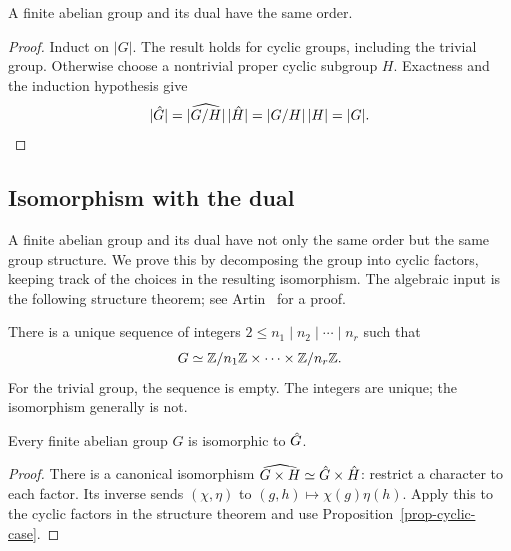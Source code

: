 
\begin{cor}
\label{cor-order-dual-equal-order-group}
A finite abelian group and its dual have the same order.
\end{cor}
\begin{proof}
Induct on $|G|$. The result holds for cyclic groups, including the trivial
group. Otherwise choose a nontrivial proper cyclic subgroup $H$. Exactness
and the induction hypothesis give
\[
 |\hat{G}|=|\widehat{G/H}|\,|\hat{H}|=|G/H|\,|H|=|G|.
\]
\end{proof}

\subsection{Isomorphism with the dual}
\label{sect2-thm-isomorphism}
A finite abelian group and its dual have not only the same order but
the same group structure. We prove this by decomposing the group into
cyclic factors, keeping track of the choices in the resulting isomorphism.
The algebraic input is the following structure theorem; see
Artin~\cite{artin} for a proof.

\begin{thm}
\label{thm-structure-abelian-groups}
There is a unique sequence of integers $2\leq n_1\mid n_2\mid\cdots\mid n_r$
such that
\[
 G\simeq\mathbb{Z}/n_1\mathbb{Z}\times\cdots\times\mathbb{Z}/n_r\mathbb{Z}.
\]
For the trivial group, the sequence is empty. The integers are unique;
the isomorphism generally is not.
\end{thm}


\begin{cor}
\label{cor-thm-isomorphism}
Every finite abelian group $G$ is isomorphic to $\hat{G}$.
\end{cor}
\begin{proof}
There is a canonical isomorphism
$\widehat{G\times H}\simeq\hat{G}\times\hat{H}$: restrict a character to each
factor. Its inverse sends $(\chi,\eta)$ to
$(g,h)\mapsto\chi(g)\eta(h)$. Apply this to the cyclic factors in the
structure theorem and use Proposition~\ref{prop-cyclic-case}.
\end{proof}


